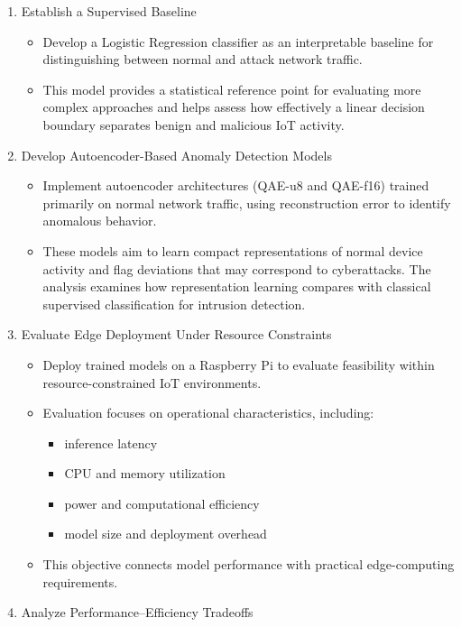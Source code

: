 \documentclass[
  letterpaper,
  DIV=11,
  numbers=noendperiod]{scrartcl}
\begin{document}
\begin{enumerate}
\def\labelenumi{\arabic{enumi}.}
\item
  Establish a Supervised Baseline

  \begin{itemize}
  \item
    Develop a Logistic Regression classifier as an interpretable
    baseline for distinguishing between normal and attack network
    traffic.
  \item
    This model provides a statistical reference point for evaluating
    more complex approaches and helps assess how effectively a linear
    decision boundary separates benign and malicious IoT activity.
  \end{itemize}
\item
  Develop Autoencoder-Based Anomaly Detection Models

  \begin{itemize}
  \item
    Implement autoencoder architectures (QAE-u8 and QAE-f16) trained
    primarily on normal network traffic, using reconstruction error to
    identify anomalous behavior.
  \item
    These models aim to learn compact representations of normal device
    activity and flag deviations that may correspond to cyberattacks.
    The analysis examines how representation learning compares with
    classical supervised classification for intrusion detection.
  \end{itemize}
\item
  Evaluate Edge Deployment Under Resource Constraints

  \begin{itemize}
  \item
    Deploy trained models on a Raspberry Pi to evaluate feasibility
    within resource-constrained IoT environments.
  \item
    Evaluation focuses on operational characteristics, including:

    \begin{itemize}
    \item
      inference latency
    \item
      CPU and memory utilization
    \item
      power and computational efficiency
    \item
      model size and deployment overhead
    \end{itemize}
  \item
    This objective connects model performance with practical
    edge-computing requirements.
  \end{itemize}
\item
  Analyze Performance--Efficiency Tradeoffs


\end{enumerate}
\end{document}
